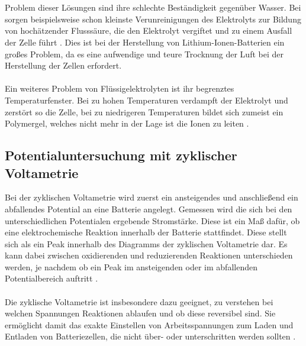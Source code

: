 \documentclass[a4paper, 11pt, headsepline,footsepline,twoside,abstract]{scrbook}
\begin{document}
\\\\
Problem dieser Lösungen sind ihre schlechte Beständigkeit gegenüber Wasser. Bei  sorgen beispielsweise schon kleinste Verunreinigungen des Elektrolyts zur Bildung von hochätzender Flusssäure, die den Elektrolyt vergiftet und zu einem Ausfall der Zelle führt \cite{xu2004nonaqueous}. Dies ist bei der Herstellung von Lithium-Ionen-Batterien ein großes Problem, da es eine aufwendige und teure Trocknung der Luft bei der Herstellung der Zellen erfordert.
\\\\
Ein weiteres Problem von Flüssigelektrolyten ist ihr begrenztes Temperaturfenster. Bei zu hohen Temperaturen verdampft der Elektrolyt und zerstört so die Zelle, bei zu niedrigeren Temperaturen bildet sich zumeist ein Polymergel, welches nicht mehr in der Lage ist die Ionen zu leiten \cite{blomgren2003liquid}.
\subsection{Potentialuntersuchung mit zyklischer Voltametrie}
Bei der zyklischen Voltametrie wird zuerst ein ansteigendes und anschließend ein abfallendes Potential an eine Batterie angelegt. Gemessen wird die sich bei den unterschiedlichen Potentialen ergebende Stromstärke. Diese ist ein Maß dafür, ob eine elektrochemische Reaktion innerhalb der Batterie stattfindet. Diese stellt sich als ein Peak innerhalb des Diagramms der zyklischen Voltametrie dar. Es kann dabei zwischen oxidierenden und reduzierenden Reaktionen unterschieden werden, je nachdem ob ein Peak im ansteigenden oder im abfallenden Potentialbereich auftritt \cite{Hamann2005}.
\\\\
Die zyklische Voltametrie ist insbesondere dazu geeignet, zu verstehen bei welchen Spannungen Reaktionen ablaufen und ob diese reversibel sind. Sie ermöglicht damit das exakte Einstellen von Arbeitsspannungen zum Laden und Entladen von Batteriezellen, die nicht über- oder unterschritten werden sollten \cite{Linden2011}.
\end{document}
